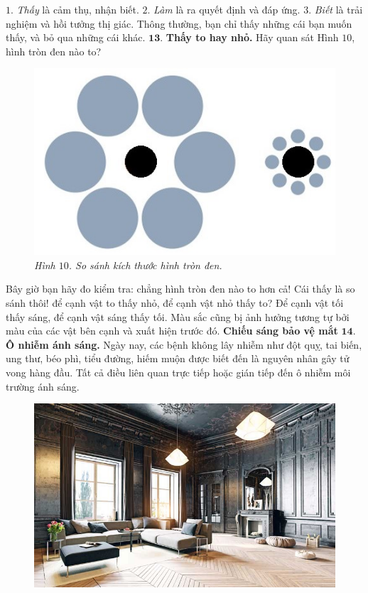 \begin{multicols}{2}
	\vskip 0.1cm
	$1$. \textit{Thấy} là cảm thụ, nhận biết.
	\vskip 0.1cm
	$2$. \textit{Làm} là ra quyết định và đáp ứng. 
	\vskip 0.1cm
	$3$. \textit{Biết} là trải nghiệm và hồi tưởng thị giác.
	\vskip 0.1cm
	Thông thường, bạn chỉ thấy những cái bạn muốn thấy, và bỏ qua những cái khác.  
	\vskip 0.1cm
	$\pmb{13.}$ \textbf{\color{timhieukhoahoc}Thấy to hay nhỏ.}
	\vskip 0.1cm Hãy quan sát Hình $10$, hình tròn đen nào to? 
	\begin{figure}[H]
		\vspace*{-5pt}
		\centering
		\captionsetup{labelformat= empty, justification=centering}
		\includegraphics[width= 1\linewidth]{10}
		\caption{\small\textit{\color{timhieukhoahoc}Hình $10$. So sánh kích thước hình tròn đen.}}
		\vspace*{-10pt}
	\end{figure}
	Bây giờ bạn hãy đo kiểm tra: chẳng hình tròn đen nào to hơn cả! 
	\vskip 0.1cm
	Cái thấy là so sánh thôi! để cạnh vật to thấy nhỏ, để cạnh vật nhỏ thấy to? Để cạnh vật tối thấy sáng, để cạnh vật sáng thấy tối. Màu sắc cũng bị ảnh hưởng tương tự bởi màu của các vật bên cạnh và xuất hiện trước đó.  
	\vskip 0.1cm
	\textbf{\color{timhieukhoahoc}Chiếu sáng bảo vệ mắt}
	\vskip 0.1cm
	$\pmb{14.}$ \textbf{\color{timhieukhoahoc}Ô nhiễm ánh sáng.}
	\vskip 0.1cm
	Ngày nay, các bệnh không lây nhiễm như đột quỵ, tai biến, ung thư, béo phì, tiểu đường, hiếm muộn được biết đến là nguyên nhân gây tử vong hàng đầu. Tất cả điều liên quan trực tiếp hoặc gián tiếp đến ô nhiễm môi trường ánh sáng. 
	\begin{figure}[H]
		\vspace*{-5pt}
		\centering
		\captionsetup{labelformat= empty, justification=centering}
		\includegraphics[width= 1\linewidth]{11}

\end{figure}
\end{multicols}
